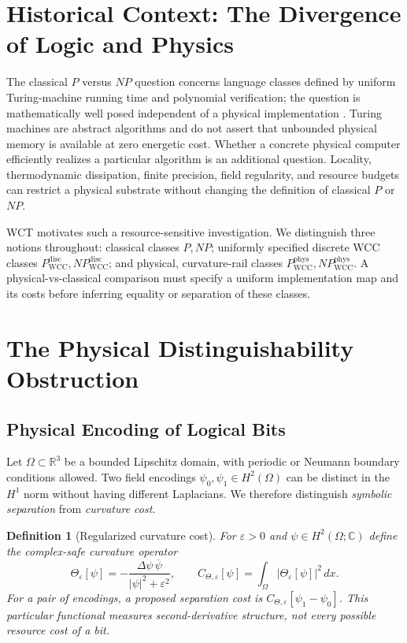 \documentclass[11pt,a4paper]{article}
\newtheorem{definition}[theorem]{Definition}
\newcommand{\CTheta}{C_{\Theta,\varepsilon}}
\begin{document}
\section{Historical Context: The Divergence of Logic and Physics}
The classical $P$ versus $NP$ question concerns language classes defined by
uniform Turing-machine running time and polynomial verification; the question
is mathematically well posed independent of a physical implementation
\cite{Sipser,AroraBarak2009}. Turing machines are abstract algorithms and do
not assert that unbounded physical memory is available at zero energetic cost.
Whether a concrete physical computer efficiently realizes a particular
algorithm is an additional question. Locality, thermodynamic dissipation,
finite precision, field regularity, and resource budgets can restrict a
physical substrate without changing the definition of classical $P$ or $NP$.

WCT motivates such a resource-sensitive investigation. We distinguish three
notions throughout: classical classes $P,NP$; uniformly specified discrete
WCC classes $P^{\mathrm{disc}}_{\mathrm{WCC}},NP^{\mathrm{disc}}_{\mathrm{WCC}}$;
and physical, curvature-rail classes
$P^{\mathrm{phys}}_{\mathrm{WCC}},NP^{\mathrm{phys}}_{\mathrm{WCC}}$.
A physical-vs-classical comparison must specify a uniform implementation
map and its costs before inferring equality or separation of these classes.

\section{The Physical Distinguishability Obstruction}
\label{sec:distinguishability}
\subsection{Physical Encoding of Logical Bits}
Let $\Omega\subset\mathbb R^3$ be a bounded Lipschitz domain, with
periodic or Neumann boundary conditions allowed. Two field encodings
$\psi_0,\psi_1\in H^2(\Omega)$ can be distinct in the $H^1$ norm without
having different Laplacians. We therefore distinguish \emph{symbolic
separation} from \emph{curvature cost}.

\begin{definition}[Regularized curvature cost]
\label{def:regularized}
For $\varepsilon>0$ and $\psi\in H^2(\Omega;\mathbb C)$ define the
complex-safe curvature operator
\[
\Theta_\varepsilon[\psi]
 =-\frac{\Delta\psi\,\overline\psi}{|\psi|^2+\varepsilon^2},
\qquad
\CTheta[\psi]=\int_\Omega|\Theta_\varepsilon[\psi]|^2\,dx.
\]
For a pair of encodings, a proposed separation cost is
$\CTheta[\psi_1-\psi_0]$. This particular functional measures
second-derivative structure, not every possible resource cost of a bit.
\end{definition}
\end{document}
